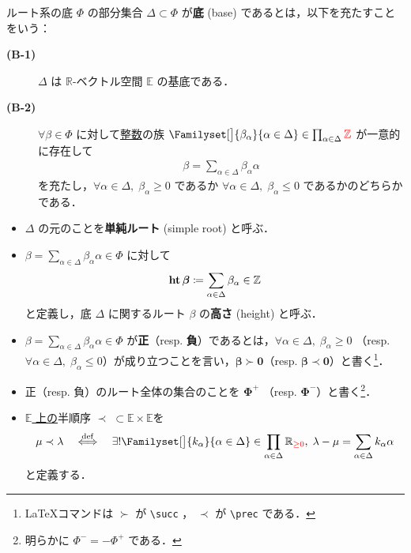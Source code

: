 \documentclass[rep_main]{subfiles}
\begin{document}
\begin{mydef}[label=def:base-root,breakable]{ルート系の底}
	$\Phi$ の部分集合 $\Delta \subset \Phi$ が\textbf{底} (base) であるとは，以下を充たすことをいう：
	\begin{description}
		\item[\textbf{(B-1)}] $\Delta$ は $\mathbb{R}$-ベクトル空間 $\mathbb{E}$ の基底である．
		\item[\textbf{(B-2)}] $\forall \beta \in \Phi$ に対して\underline{整数}の族 $\Familyset[\big]{\beta_\alpha}{\alpha \in \Delta} \in \prod_{\alpha \in \Delta} \textcolor{red}{\mathbb{Z}}$ が一意的に存在して
		\begin{align}
			\beta = \sum_{\alpha \in \Delta} \beta_\alpha \alpha
		\end{align}
		を充たし，$\forall \alpha \in \Delta,\; \beta_\alpha \ge 0$ であるか $\forall \alpha \in \Delta,\; \beta_\alpha \le 0$ であるかのどちらかである．
	\end{description}
	\tcblower
	\begin{itemize}
		\item $\Delta$ の元のことを\textbf{単純ルート} (simple root) と呼ぶ．
		\item $\beta = \sum_{\alpha \in \Delta} \beta_\alpha \alpha \in \Phi$ に対して
		\begin{align}
			\bm{\height \beta} \coloneqq \sum_{\alpha \in \Delta} \beta_\alpha \in \mathbb{Z}
		\end{align}
		と定義し，底 $\Delta$ に関するルート $\beta$ の\textbf{高さ} (height) と呼ぶ． 
		\item $\beta = \sum_{\alpha \in \Delta} \beta_\alpha \alpha \in \Phi$ が\textbf{正}（resp. \textbf{負}）であるとは，$\forall \alpha \in \Delta,\; \beta_\alpha \ge 0$ （resp. $\forall \alpha \in \Delta,\; \beta_\alpha \le 0$）が成り立つことを言い，$\bm{\beta \succ 0}$（resp. $\bm{\beta \prec 0}$）と書く\footnote{\LaTeX コマンドは $\succ$ が \texttt{\textbackslash succ} ， $\prec$ が \texttt{\textbackslash prec} である．}．
		\item 正（resp. 負）のルート全体の集合のことを $\bm{\Phi^+}$ （resp. $\bm{\Phi^-}$）と書く\footnote{明らかに $\Phi^- = - \Phi^+$ である．}．
		\item \underline{$\mathbb{E}$ 上の}半順序 $\bm{\prec}\; \subset \mathbb{E} \times \mathbb{E}$を
		\begin{align}
			\mu \prec \lambda \DEF  \exists! \Familyset[\big]{k_\alpha}{\alpha \in \Delta} \in \prod_{\alpha \in \Delta} \mathbb{R}_{\textcolor{red}{\ge 0}},\; \lambda - \mu = \sum_{\alpha \in \Delta} k_\alpha \alpha
		\end{align}
		と定義する．
	\end{itemize}
\end{mydef}
\end{document}
